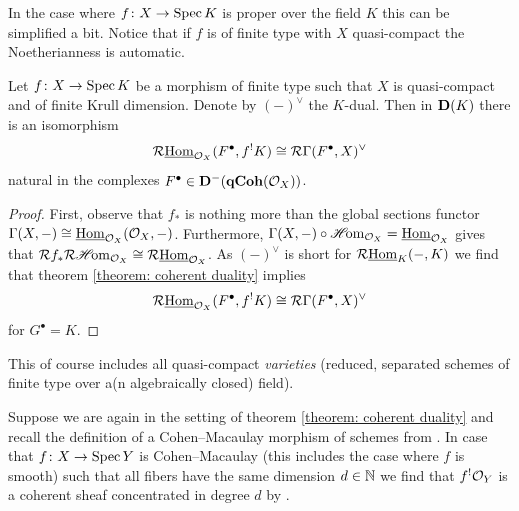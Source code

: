 In the case where $f\colon X\to \operatorname{Spec} K$ is proper over the field $K$ this can be simplified a bit. Notice that if $f$ is of finite type with $X$ quasi-compact the Noetherianness is automatic.
\begin{corollary}
	\label{corollary: coherent duality, a special case}
	
	Let $f\colon X\to \operatorname{Spec} K$ be a morphism of finite type such that $X$ is quasi-compact and of finite Krull dimension. Denote by $(-)^\vee$ the $K$-dual. Then in ${{\mathbf{D}}(K)}$ there is an isomorphism
	$$\mathcal{R}{\underline{\operatorname{Hom}}}_{{\mathcal{O}}_{X}}(F^\bullet, f^!K)\cong \mathcal{R}\Gamma(F^\bullet, X)^\vee$$
	natural in the complexes $F^\bullet \in {{\mathbf{D}}^-({{\mathbf{qCoh}}({{\mathcal{O}}_{X}})})}$.
\end{corollary}
\begin{proof}
	First, observe that $f_\ast$ is nothing more than the global sections functor $\Gamma(X, -)\cong {\underline{\operatorname{Hom}}}_{{\mathcal{O}}_{X}}({{\mathcal{O}}_{X}}, -)$. Furthermore, $\Gamma(X, -) \circ {\operatorname{\mathscr{H}\!om}}_{{\mathcal{O}}_{X}} = {\underline{\operatorname{Hom}}}_{{\mathcal{O}}_{X}}$ gives that $\mathcal{R} f_\ast\mathcal{R}{\operatorname{\mathscr{H}\!om}}_{{\mathcal{O}}_{X}} \cong \mathcal{R}{\underline{\operatorname{Hom}}}_{{\mathcal{O}}_{X}}$. As $(-)^\vee$ is short for $\mathcal{R}{\underline{\operatorname{Hom}}}_K(-, K)$ we find that theorem \ref{theorem: coherent duality} implies
	$$\mathcal{R}{\underline{\operatorname{Hom}}}_{{\mathcal{O}}_{X}}(F^\bullet, f^!K)\cong \mathcal{R}\Gamma(F^\bullet, X)^\vee$$
	for $G^\bullet = K$.
\end{proof}
This of course includes all quasi-compact \emph{varieties} (reduced, separated schemes of finite type over a(n algebraically closed) field).


\begin{remark}
	\label{remark: upper shriek of structure sheaf is concentrated}
	
	Suppose we are again in the setting of theorem \ref{theorem: coherent duality} and recall the definition of a Cohen--Macaulay morphism of schemes from \cite[\href{https://stacks.math.columbia.edu/tag/045Q}{Tag 045Q}]{stacks-project}.	In case that $f\colon X\to \operatorname{Spec} Y$ is Cohen--Macaulay (this includes the case where $f$ is smooth) such that all fibers have the same dimension $d\in{\mathbb{N}}$ we find that $f^!{{\mathcal{O}}_{Y}}$ is a coherent sheaf concentrated in degree $d$ by \cite[Chapter VII, \S4]{residues}.
\end{remark}

